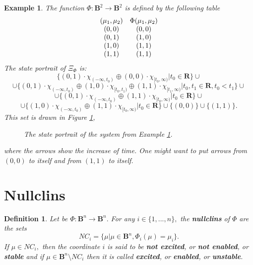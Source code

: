 \documentclass[12pt]{article}\usepackage{amsmath}
\newtheorem{definition}[theorem]{Definition}
\newtheorem{example}[theorem]{Example}
\begin{document}
\begin{example}
\label{Exa34}The function $\Phi:\mathbf{B}^{2}\rightarrow\mathbf{B}^{2}$ is
defined by the following table\[\begin{array}
[c]{cc}(\mu_{1},\mu_{2}) & \Phi(\mu_{1},\mu_{2})\\
(0,0) & (0,0)\\
(0,1) & (1,0)\\
(1,0) & (1,1)\\
(1,1) & (1,1)
\end{array}
\]
The state portrait of $\Xi_{\Phi}$ is:\[
\{(0,1)\cdot\chi_{(-\infty,t_{0})}\oplus(0,0)\cdot\chi_{\lbrack t_{0},\infty
)}|t_{0}\in\mathbf{R}\}\cup
\]\[
\cup\{(0,1)\cdot\chi_{(-\infty,t_{0})}\oplus(1,0)\cdot\chi_{\lbrack
t_{0},t_{1})}\oplus(1,1)\cdot\chi_{\lbrack t_{1},\infty)}|t_{0},t_{1}\in\mathbf{R},t_{0}<t_{1}\}\cup
\]\[
\cup\{(0,1)\cdot\chi_{(-\infty,t_{0})}\oplus(1,1)\cdot\chi_{\lbrack
t_{0},\infty)}|t_{0}\in\mathbf{R}\}\cup
\]\[
\cup\{(1,0)\cdot\chi_{(-\infty,t_{0})}\oplus(1,1)\cdot\chi_{\lbrack
t_{0},\infty)}|t_{0}\in\mathbf{R}\}\cup\{(0,0)\}\cup\{(1,1)\}.
\]
This set is drawn in Figure \ref{ph1},\begin{figure}
[ptb]
\begin{center}
\caption{The state portrait of the system from Example \ref{Exa34}.}\label{ph1}\end{center}
\end{figure}
where the arrows show the increase of time. One might want to put arrows from
$(0,0)$ to itself and from $(1,1)$ to itself.
\end{example}

\section{Nullclins}

\begin{definition}
Let be $\Phi:\mathbf{B}^{n}\rightarrow\mathbf{B}^{n}.$ For any $i\in
\{1,...,n\},$ the \textbf{nullclins} of $\Phi$ are the sets\[
NC_{i}=\{\mu|\mu\in\mathbf{B}^{n},\Phi_{i}(\mu)=\mu_{i}\}.
\]
If $\mu\in NC_{i},$ then the coordinate $i$ is said to be \textbf{not
excited}, or \textbf{not enabled}, or \textbf{stable} and if $\mu\in
\mathbf{B}^{n}\setminus NC_{i}$ then it is called \textbf{excited}, or
\textbf{enabled}, or \textbf{unstable}.
\end{definition}
\end{document}
